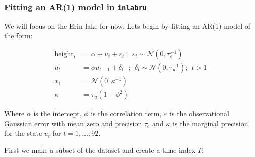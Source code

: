 \documentclass[
  letterpaper,
  DIV=11,
  numbers=noendperiod]{scrartcl}
\newenvironment{Shaded}{\begin{snugshade}}{\end{snugshade}}
\newcommand{\DecValTok}[1]{\textcolor[rgb]{0.68,0.00,0.00}{#1}}
\newcommand{\FunctionTok}[1]{\textcolor[rgb]{0.28,0.35,0.67}{#1}}
\newcommand{\NormalTok}[1]{\textcolor[rgb]{0.00,0.23,0.31}{#1}}
\newcommand{\OtherTok}[1]{\textcolor[rgb]{0.00,0.23,0.31}{#1}}
\newcommand{\SpecialCharTok}[1]{\textcolor[rgb]{0.37,0.37,0.37}{#1}}
\newcommand{\StringTok}[1]{\textcolor[rgb]{0.13,0.47,0.30}{#1}}
\begin{document}
\subsubsection{\texorpdfstring{Fitting an AR(1) model in
\texttt{inlabru}}{Fitting an AR(1) model in inlabru}}\label{fitting-an-ar1-model-in-inlabru}

We will focus on the Erin lake for now. Lets begin by fitting an AR(1)
model of the form:

\[
\begin{aligned}
\text{height}_t &= \alpha + u_t +\varepsilon_t~; ~~ \varepsilon_t\sim \mathcal{N}(0,\tau_e^{-1}) \\
u_t &= \phi u_{t-1} + \delta_t~~~ ; ~~ \delta_t \sim \mathcal{N}(0,\tau_u^{-1}); ~~ t > 1 \\
x_1 &= \mathcal{N}(0,\kappa^{-1})\\
\kappa &= \tau_u (1-\phi^2)
\end{aligned}
\]

Where \(\alpha\) is the intercept, \(\phi\) is the correlation term,
\(\varepsilon\) is the observational Gaussian error with mean zero and
precision \(\tau_e\) and \(\kappa\) is the marginal precision for the
state \(u_t\) for \(t= 1,\ldots,92\).

First we make a subset of the dataset and create a time index \(T\):

\begin{Shaded}
\end{Shaded}
\end{document}
